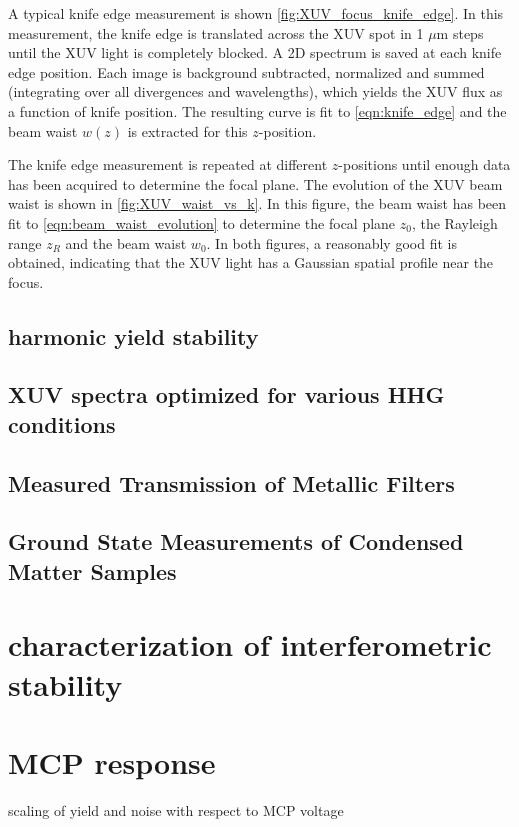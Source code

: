 A typical knife edge measurement is shown \cref{fig:XUV_focus_knife_edge}. In this measurement, the knife edge is translated across the XUV spot in 1 $\mu$m steps until the XUV light is completely blocked. A 2D spectrum is saved at each knife edge position. Each image is background subtracted, normalized and summed (integrating over all divergences and wavelengths), which yields the XUV flux as a function of knife position. The resulting curve is fit to \cref{eqn:knife_edge} and the beam waist $w(z)$ is extracted for this $z$-position.

The knife edge measurement is repeated at different $z$-positions until enough data has been acquired to determine the focal plane. The evolution of the XUV beam waist is shown in \cref{fig:XUV_waist_vs_k}. In this figure, the beam waist has been fit to \cref{eqn:beam_waist_evolution} to determine the focal plane $z_0$, the Rayleigh range $z_R$ and the beam waist $w_0$. In both figures, a reasonably good fit is obtained, indicating that the XUV light has a Gaussian spatial profile near the focus.


\subsection{harmonic yield stability}

\subsection{XUV spectra optimized for various HHG conditions}

\subsection{Measured Transmission of Metallic Filters}

\subsection{Ground State Measurements of Condensed Matter Samples}

\section{characterization of interferometric stability}

\section{MCP response}
scaling of yield and noise with respect to MCP voltage
